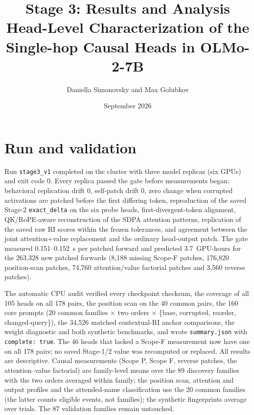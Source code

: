 \documentclass[11pt,a4paper]{article}
\title{Stage 3: Results and Analysis\\\large Head-Level Characterization of the Single-hop Causal Heads in OLMo-2-7B}
\author{Daniella Simonovsky and Max Golubkov}
\date{September 2026}
\begin{document}
\maketitle

\section{Run and validation}
Run \texttt{stage3\_v1} completed on the cluster with three model replicas (six GPUs)
and exit code 0. Every replica passed the gate before measurements began: behavioral
replication drift 0, self-patch drift 0, zero change when corrupted activations are
patched before the first differing token, reproduction of the saved Stage-2
\texttt{exact\_delta} on the six probe heads, first-divergent-token alignment,
QK/RoPE-aware reconstruction of the SDPA attention patterns, replication of the saved
raw RI scores within the frozen tolerances, and agreement between the joint
attention+value replacement and the ordinary head-output patch. The gate measured
0.151--0.152~s per patched forward and predicted 3.7~GPU-hours for the 263{,}328
new patched forwards (8{,}188 missing Scope-F patches, 176{,}820 position-scan
patches, 74{,}760 attention/value factorial patches and 3{,}560 reverse patches).

The automatic CPU audit verified every checkpoint checksum, the coverage of all 105
heads on all 178 pairs, the position scan on the 40 common pairs, the 160 core prompts
(20 common families $\times$ two orders $\times$ \{base, corrupted, reorder,
changed-query\}), the 34{,}526 matched contextual-RI anchor comparisons, the weight
diagnostic and both synthetic benchmarks, and wrote \texttt{summary.json} with
\texttt{complete: true}. The 46 heads that lacked a Scope-F measurement now have one
on all 178 pairs; no saved Stage-1/2 value was recomputed or replaced. All results are
descriptive. Causal measurements (Scope P, Scope F, reverse patches, the attention--value
factorial) are family-level means over the 89 discovery families with the two orders
averaged within family; the position scan, attention and output profiles and the
attended-name classification use the 20 common families (the latter counts eligible
events, not families); the synthetic fingerprints average over trials. The 87
validation families remain untouched.
\end{document}
